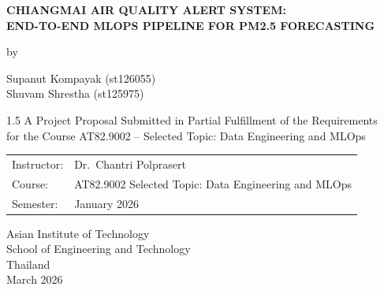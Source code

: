 \documentclass[12pt,a4paper]{report}
\begin{document}


\begin{titlepage}
\begin{center}
\vspace*{1.5cm}

{\large\bfseries CHIANGMAI AIR QUALITY ALERT SYSTEM: \\[0.4em]
END-TO-END MLOPS PIPELINE FOR PM2.5 FORECASTING}

\vspace{2.5cm}

by

\vspace{1.2cm}

{\normalsize
Supanut Kompayak (st126055) \\[0.4em]
Shuvam Shrestha (st125975)
}

\vspace{2.2cm}

\begin{spacing}{1.5}
{\normalsize
A Project Proposal Submitted in Partial Fulfillment of the Requirements \\
for the Course AT82.9002 -- Selected Topic: Data Engineering and MLOps
}
\end{spacing}

\vspace{1.5cm}

\begin{tabular}{ll}
  Instructor:   & Dr.\ Chantri Polprasert \\[0.4em]
  Course:       & AT82.9002 Selected Topic: Data Engineering and MLOps \\[0.4em]
  Semester:     & January 2026 \\
\end{tabular}

\vfill

Asian Institute of Technology \\
School of Engineering and Technology \\
Thailand \\[0.4em]
March 2026

\end{center}
\end{titlepage}
\end{document}

